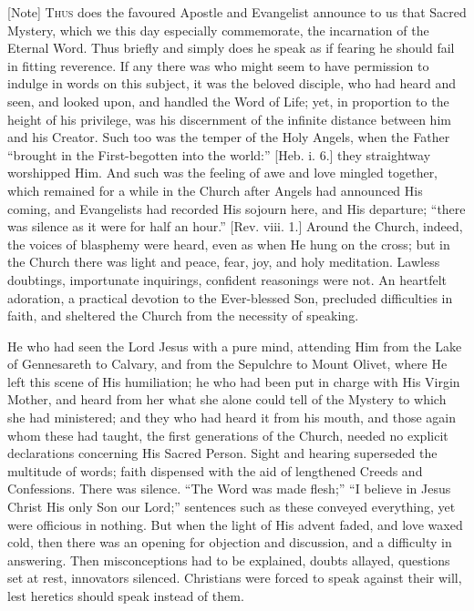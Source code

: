 [Note] T\textsc{hus} does the favoured
Apostle and Evangelist announce to us that Sacred Mystery, which we
this day especially commemorate, the incarnation of the Eternal Word.
Thus briefly and simply does he speak as if fearing he should fail in
fitting reverence. If any there was who might seem to have permission
to indulge in words on this subject, it was the beloved disciple, who
had heard and seen, and looked upon, and handled the Word of Life;
yet, in proportion to the height of his privilege, was his discernment
of the infinite distance between him and his Creator. Such too was the
temper of the Holy Angels, when the Father ``brought in the
First-begotten into the world:'' [Heb. i. 6.] they straightway
worshipped Him. And such was the feeling of awe and love mingled
together, which remained for a while in the Church after Angels had
announced His coming, and Evangelists had recorded His sojourn here,
and His departure; ``there was silence as it were for half an
hour.'' [Rev. viii. 1.] Around the Church, indeed, the voices of
blasphemy were heard, even as when He hung on the cross; but in the
Church there was light and peace, fear, joy, and holy meditation.
Lawless doubtings, importunate inquirings, confident reasonings were
not. An heartfelt adoration, a practical devotion to the Ever-blessed
Son, precluded difficulties in faith, and sheltered the Church from
the necessity of speaking.

He who had seen the Lord Jesus with a pure mind, attending Him from
the Lake of Gennesareth to Calvary, and from the Sepulchre to Mount
Olivet, where He left this scene of His humiliation; he who had been
put in charge with His Virgin Mother, and heard from her what she
alone could tell of the Mystery to which she had ministered; and they
who had heard it from his mouth, and those again whom these had
taught, the first generations of the Church, needed no explicit
declarations concerning His Sacred Person. Sight and hearing
superseded the multitude of words; faith dispensed with the aid of
lengthened Creeds and Confessions. There was silence. ``The Word
was made flesh;'' ``I believe in Jesus Christ His only Son our
Lord;'' sentences such as these conveyed everything, yet were
officious in nothing. But when the light of His advent faded, and love
waxed cold, then there was an opening for objection and discussion,
and a difficulty in answering. Then misconceptions had to be
explained, doubts allayed, questions set at rest, innovators silenced.
Christians were forced to speak against their will, lest heretics
should speak instead of them.

